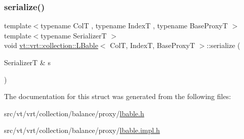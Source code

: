 \mbox{\label{structvt_1_1vrt_1_1collection_1_1_l_bable_aa67e248263b00c518aabc537869de11f}} 
\subsubsection{\texorpdfstring{serialize()}{serialize()}}
{\footnotesize\ttfamily template$<$typename ColT , typename IndexT , typename Base\+ProxyT $>$ \\
template$<$typename SerializerT $>$ \\
void \hyperlink{structvt_1_1vrt_1_1collection_1_1_l_bable}{vt\+::vrt\+::collection\+::\+L\+Bable}$<$ ColT, IndexT, Base\+ProxyT $>$\+::serialize (\begin{DoxyParamCaption}\item[{SerializerT \&}]{s }\end{DoxyParamCaption})}



The documentation for this struct was generated from the following files\+:\begin{DoxyCompactItemize}
\item 
src/vt/vrt/collection/balance/proxy/\hyperlink{lbable_8h}{lbable.\+h}\item 
src/vt/vrt/collection/balance/proxy/\hyperlink{lbable_8impl_8h}{lbable.\+impl.\+h}\end{DoxyCompactItemize}
